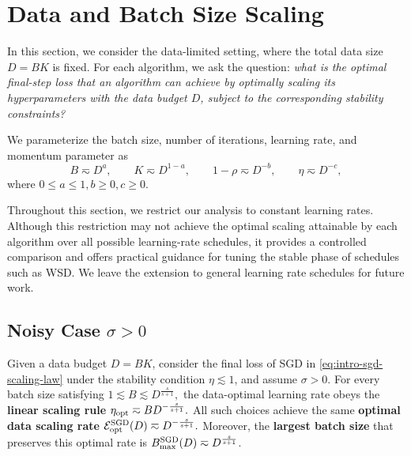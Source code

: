 \documentclass[11pt]{article}
\begin{document}
\section{Data and Batch Size Scaling}
In this section, we consider the data-limited setting, where the total data size \(D=BK\) is fixed. For each algorithm, we ask the question: \textit{what is the optimal final-step loss that an algorithm can achieve by optimally scaling its hyperparameters with the data budget \(D\), subject to the corresponding stability constraints?}

We parameterize the batch size, number of iterations, learning rate, and
momentum parameter as
\begin{equation}
\label{eq:data-scaling-parameterization}
    B\eqsim D^a,
    \qquad
    K\eqsim D^{1-a},
    \qquad
    1-\rho\eqsim D^{-b},
    \qquad
    \eta\eqsim D^{-c},
\end{equation}
where \(0\leq a\leq1,b\geq0,c\geq0.\)

Throughout this section, we restrict our analysis to constant learning rates. Although this restriction may not achieve the optimal scaling attainable by each algorithm over all possible learning-rate schedules, it provides a controlled comparison and offers practical guidance for tuning the stable phase of schedules such as WSD. We leave the extension to general learning rate schedules for future work.

\subsection{Noisy Case \texorpdfstring{\(\sigma > 0\)}{sigma = 0}}
\label{subsec:noisy}

\begin{proposition}
\label{prop:sgd data scaling}
Given a data budget \(D=BK\), consider the final loss of SGD in
\eqref{eq:intro-sgd-scaling-law} under the stability condition \(\eta\lesssim 1\), and assume \(\sigma>0\). For every batch size satisfying \(1\lesssim B\lesssim D^{\frac{s}{s+1}},\) the data-optimal learning rate obeys the \textbf{linear scaling rule} \(\eta_{\rm opt}\eqsim B D^{-\frac{s}{s+1}}.\) All such choices achieve the same \textbf{optimal data scaling rate} \(\mathcal{E}_{\rm opt}^{\rm SGD}(D)\eqsim D^{-\frac{s}{s+1}}.\)
Moreover, the \textbf{largest batch size} that preserves this optimal rate is \(B_{\max}^{\rm SGD}(D)\eqsim D^{\frac{s}{s+1}}\).
\end{proposition}
\end{document}
